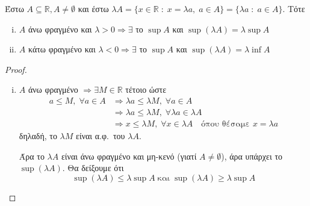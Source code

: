 \documentclass[main.tex]{subfiles}
\begin{document}
\begin{mypropbox}
  Έστω $ A \subseteq \mathbb{R}, A \neq \emptyset $ και έστω $ \lambda A = 
  \{ x \in \mathbb{R} \; : \; x = \lambda a, \; a \in A \} = \{ \lambda a \; : \; 
  a \in A\} $. Τότε
  \begin{enumerate}[(i)]
    \item $ A $ άνω φραγμένο και $ \lambda >0 \Rightarrow \exists $ το $ \sup A $
      και $ \sup (\lambda A) = \lambda \sup A $
    \item $ A $ κάτω φραγμένο και $ \lambda <0 \Rightarrow \exists $ το $ \sup A $
      και $ \sup (\lambda A) = \lambda \inf A $
  \end{enumerate}
\end{mypropbox}

\begin{proof}
\item {}
  \begin{enumerate}[(i)]
    \item $A$ άνω φραγμένο $ \Rightarrow \exists M \in \mathbb{R} $ τέτοιο ώστε
      \begin{align*}
        a \leq M, \; \forall a \in A
                &\Rightarrow \lambda a \leq \lambda M, \; \forall a \in A \\
                &\Rightarrow \lambda a \leq \lambda M, \; \forall \lambda a \in 
                \lambda A \\
                & \Rightarrow x \leq \lambda M, \; \forall x \in \lambda A \quad
                \text{όπου θέσαμε } x = \lambda a
      \end{align*}
      δηλαδή, το  $ \lambda M $ είναι α.φ.\ του $ \lambda A $.

      Άρα το $ \lambda A $ είναι άνω φραγμένο και μη-κενό (γιατί $ A \neq 
      \emptyset $), άρα υπάρχει το $ \sup (\lambda A) $.
      Θα δείξουμε ότι 
      \[ 
        \sup (\lambda A) \leq \lambda \sup A  \; \text{και} \; \sup (\lambda A) 
        \geq \lambda \sup A 
      \]
\end{enumerate}
\end{proof}
\end{document}
